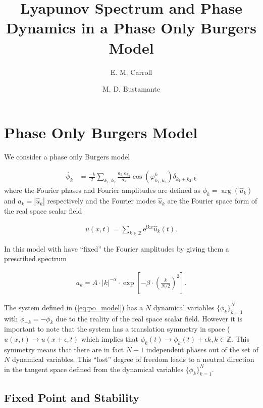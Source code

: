 \documentclass[9pt]{article}
\title{\textbf{Lyapunov Spectrum and Phase Dynamics in a Phase Only Burgers Model}}
\author[$1$]{E. M. Carroll}
\author[$1$]{M. D. Bustamante}
\affil[$1$]{Department of Mathematics and Statistics, University College Dublin, Dublin, Ireland}
\newcommand{\uhat}[1]{\hat{u}_{#1}}      				          %
\begin{document}
\maketitle	


\section{Phase Only Burgers Model}

We consider a phase only Burgers model


\begin{align}
	\dot{\phi_k} &= \frac{ -k }{ 2 } \sum_{k_1, k_2 } \frac{ a_{k_1}a_{k_2} }{a_k}\cos( \varphi_{k_1, k_2}^{k} ) \delta_{k_1 + k_2, k}  
	\label{eq:po_model}
\end{align}
where the Fourier phases and Fourier amplitudes are defined as $\phi_{k}=\arg \left(\hat{u}_{k}\right)$ and $a_k = |\uhat{k}|$ respectively and the Fourier modes $\uhat{k}$ are the Fourier space form of the real space scalar field 

\begin{align}
	u(x, t)=\sum_{k \in \mathbb{Z}} \mathrm{e}^{\mathrm{i} k x} \hat{u}_{k}(t).
	\label{eq:fourier_expansion}
\end{align}

In this model with have ``fixed'' the Fourier amplitudes by giving them a prescribed spectrum


\begin{align}
	a_{k}=A \cdot|k|^{-\alpha} \cdot \exp \left[-\beta \cdot\left(\frac{k}{N / 2}\right)^{2}\right].
	\label{eq:fixed_amp}
\end{align}

The system defined in (\ref{eq:po_model}) has a $N$ dynamical variables $\{\phi_k\}_{k = 1}^{N}$ with $\phi_{-k} = -\phi_k$ due to the reality of the real space scalar field. However it is important to note that the system has a translation symmetry in space ($u(x, t) \rightarrow u(x + \epsilon, t)$ which implies that $\phi_k(t) \rightarrow \phi_k(t) + \epsilon k, k\in \mathbb{Z}$. This symmetry means that there are in fact $N - 1$ independent phases out of the set of $N$ dynamical variables. This ``lost'' degree of freedom leads to a neutral direction in the tangent space defined from the dynamical variables $\{\phi_k\}_{k = 1}^{N}$.


\subsection{Fixed Point and Stability}
\end{document}
